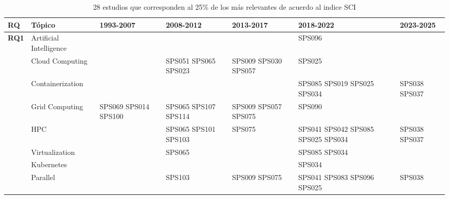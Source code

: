 \begin{table*}[htbp]
	\centering
	\caption{28 estudios que corresponden al 25\% de los más relevantes de acuerdo al indice SCI}
	\label{table:highest_SCI}
	\renewcommand{\arraystretch}{1.2}
	\setlength{\tabcolsep}{6pt}
	\begin{tabularx}{\textwidth}{p{0.8cm}p{2.5cm}>{\raggedright\arraybackslash}X>{\raggedright\arraybackslash}X>{\raggedright\arraybackslash}X>{\raggedright\arraybackslash}X>{\raggedright\arraybackslash}X}
		\toprule
		\textbf{RQ}                           & \textbf{Tópico}         & \textbf{1993-2007} 	& \textbf{2008-2012} 	& \textbf{2013-2017} 	& \textbf{2018-2022} 					& \textbf{2023-2025} \\
		\midrule
		\multirow{12}{*}[0em]{\textbf{RQ1}}   & Artificial Intelligence &        			 	&                    	& 			  			& SPS096								&                	 \\
		\addlinespace[0.3em]
											  & Cloud Computing         &        			 	& SPS051 SPS065 SPS023 	& SPS009 SPS030 SPS057	& SPS025								&                	 \\
		\addlinespace[0.3em]
		                                      & Containerization        &        			 	&                    	& 						& SPS085 SPS019 SPS025 SPS034  			& SPS038 SPS037		 \\
		\addlinespace[0.3em]
		                                      & Grid Computing          & SPS069 SPS014 SPS100 	& SPS065 SPS107 SPS114	& SPS009 SPS057 SPS075	& SPS090             					&                    \\
		\addlinespace[0.3em]
		                                      & HPC                     &        			 	& SPS065 SPS101 SPS103  & SPS075      			& SPS041 SPS042 SPS085 SPS025 SPS034	& SPS038 SPS037      \\
		\addlinespace[0.3em]
		                                      & Virtualization          &        			 	& SPS065             	&  			   			& SPS085 SPS034                   		&                    \\
		\addlinespace[0.3em]
		                                      & Kubernetes              &        			 	&                    	&                    	& SPS034      							&                    \\
		\addlinespace[0.3em]
		                                      & Parallel                &  			 			& SPS103                & SPS009 SPS075         & SPS041 SPS083 SPS096 SPS025			& SPS038             \\

\end{tabularx}
\end{table*}
